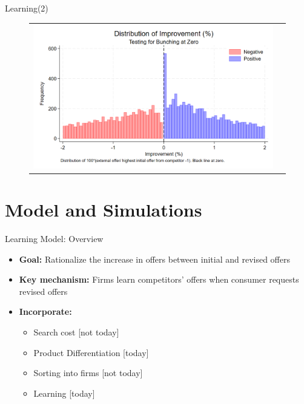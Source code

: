 \documentclass[10pt,aspectratio=169]{beamer}
\begin{document}
\begin{frame}{Learning(2)}\label{slide:fig5}
  \begin{figure}[H]
\centering{}%
\begin{tabular}{cc}
\includegraphics[scale=0.35]{../figures/IE7/IE7_hist_bunching_max(2).png} 
\end{tabular}
\end{figure}
\hyperlink{slide:Descriptive_evidence}{}
\end{frame}






\section{Model and Simulations}


\begin{frame}{Learning Model: Overview}
\begin{itemize}
    \item \textbf{Goal:} Rationalize the increase in offers between initial and revised offers
    
    \item \textbf{Key mechanism:} Firms learn competitors' offers when consumer requests revised offers

    \item \textbf{Incorporate:}
    \begin{itemize}
        \item Search cost [not today]
        \item Product Differentiation [today]
        \item Sorting into firms [not today]
        \item Learning [today]
    \end{itemize}
\end{itemize}
\end{frame}
\end{document}
